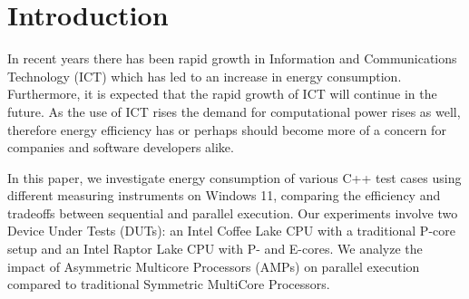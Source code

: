 \section{Introduction}

In recent years there has been rapid growth in Information and Communications Technology (ICT) which has led to an increase in energy consumption. Furthermore, it is expected that the rapid growth of ICT will continue in the future. \cite{jones2018stop,andrae2015global} As the use of ICT rises the demand for computational power rises as well, therefore energy efficiency has or perhaps should become more of a concern for companies and software developers alike.

In this paper, we investigate energy consumption of various C++ test cases using different measuring instruments on Windows 11, comparing the efficiency and tradeoffs between sequential and parallel execution. Our experiments involve two Device Under Tests (DUTs): an Intel Coffee Lake CPU with a traditional P-core setup and an Intel Raptor Lake CPU with P- and E-cores. We analyze the impact of Asymmetric Multicore Processors (AMPs) on parallel execution compared to traditional Symmetric MultiCore Processors.


